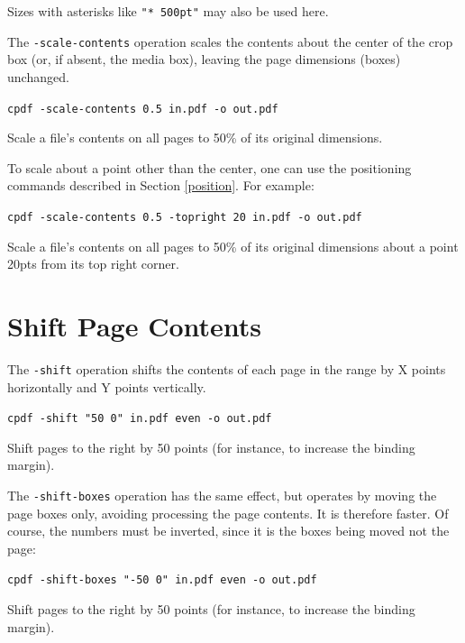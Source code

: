 \documentclass{book}
\begin{document}
\noindent Sizes with asterisks like \texttt{"* 500pt"} may also be used here.

The \texttt{-scale-contents} operation scales the contents about the center
  of the crop box (or, if absent, the media box), leaving the page dimensions
  (boxes) unchanged.

  \begin{framed}
  \small\noindent\verb!cpdf -scale-contents 0.5 in.pdf -o out.pdf!

  \vspace{2.5mm}
  \noindent Scale a file's contents on all pages to 50\% of its original dimensions.
  \end{framed}

  \noindent To scale about a point other than the center, one can use the positioning commands described in Section \ref{position}. For example:
  
  \begin{framed}
  \small\noindent\verb!cpdf -scale-contents 0.5 -topright 20 in.pdf -o out.pdf!

  \vspace{2.5mm}
  \noindent Scale a file's contents on all pages to 50\% of its original dimensions about a point 20pts from its top right corner.
  \end{framed}

  \section{Shift Page Contents}

  The \texttt{-shift} operation shifts the contents of each page in the range
by X points horizontally and Y points vertically.

  \begin{framed}
  \small\noindent\verb!cpdf -shift "50 0" in.pdf even -o out.pdf!

  \vspace{2.5mm}

  \noindent Shift pages to the right by 50 points (for instance, to increase
the binding margin).\end{framed}

\noindent The \texttt{-shift-boxes} operation has the same effect, but operates by moving the page boxes only, avoiding processing the page contents. It is therefore faster. Of course, the numbers must be inverted, since it is the boxes being moved not the page:

  \begin{framed}
  \small\noindent\verb!cpdf -shift-boxes "-50 0" in.pdf even -o out.pdf!

  \vspace{2.5mm}

  \noindent Shift pages to the right by 50 points (for instance, to increase
the binding margin).\end{framed}
\end{document}
